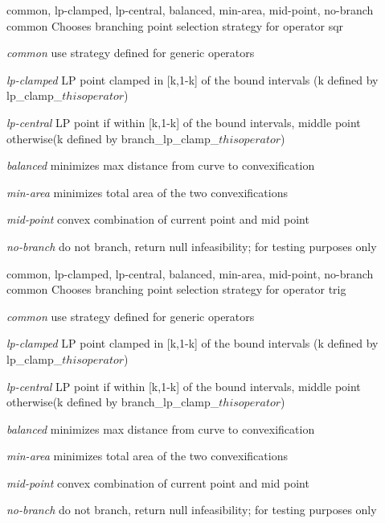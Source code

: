 %
{common, lp-clamped, lp-central, balanced, min-area, mid-point, no-branch}%
{common}%
{Chooses branching point selection strategy for operator sqr}%
{\begin{list}{}{
\setlength{\parsep}{0em}
\setlength{\leftmargin}{3ex}
\setlength{\labelwidth}{1ex}
\setlength{\itemindent}{0ex}
\setlength{\topsep}{0pt}}
\item[\textit{common}] use strategy defined for generic operators
\item[\textit{lp-clamped}] LP point clamped in [k,1-k] of the bound intervals (k defined by lp\_clamp\_${this operator}$)
\item[\textit{lp-central}] LP point if within [k,1-k] of the bound intervals, middle point otherwise(k defined by branch\_lp\_clamp\_${this operator}$)
\item[\textit{balanced}] minimizes max distance from curve to convexification
\item[\textit{min-area}] minimizes total area of the two convexifications
\item[\textit{mid-point}] convex combination of current point and mid point
\item[\textit{no-branch}] do not branch, return null infeasibility; for testing purposes only
\end{list}
}

%
{common, lp-clamped, lp-central, balanced, min-area, mid-point, no-branch}%
{common}%
{Chooses branching point selection strategy for operator trig}%
{\begin{list}{}{
\setlength{\parsep}{0em}
\setlength{\leftmargin}{3ex}
\setlength{\labelwidth}{1ex}
\setlength{\itemindent}{0ex}
\setlength{\topsep}{0pt}}
\item[\textit{common}] use strategy defined for generic operators
\item[\textit{lp-clamped}] LP point clamped in [k,1-k] of the bound intervals (k defined by lp\_clamp\_${this operator}$)
\item[\textit{lp-central}] LP point if within [k,1-k] of the bound intervals, middle point otherwise(k defined by branch\_lp\_clamp\_${this operator}$)
\item[\textit{balanced}] minimizes max distance from curve to convexification
\item[\textit{min-area}] minimizes total area of the two convexifications
\item[\textit{mid-point}] convex combination of current point and mid point
\item[\textit{no-branch}] do not branch, return null infeasibility; for testing purposes only
\end{list}
}

